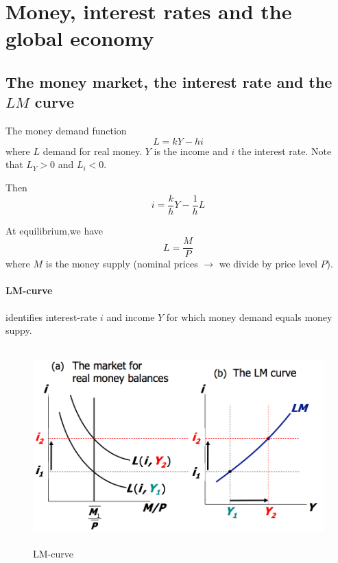 \documentclass[a4paper] {scrartcl}
\begin{document}

\section{Money, interest rates and the global economy} %
\label{sec:money_interest_rates_and_the_global_economy}

\subsection{The money market, the interest rate and the $LM$ curve} %
\label{sub:the_money_market_the_interest_rate_and_the_lm_curve}


The money demand function
\begin{equation}
	L = kY- hi
\end{equation}
where 
$L$ demand for real money.
$Y$ is the income and
$i$ the interest rate.
Note that $L_Y>0$ and $L_i<0$.

Then 
\begin{equation}
	i = \frac{k}{h}Y-\frac{1}{h}L
\end{equation}

At equilibrium,we have
\begin{equation}
	L = \frac{M}{P}
\end{equation}
where $M$ is the money supply (nominal prices $\rightarrow$ we divide by price level $P$).

\paragraph{LM-curve} %
\label{par:lm_curve}
identifies interest-rate $i$ and income $Y$ for which money demand equals money suppy.

\begin{figure}[htbp]
	\centering
		\includegraphics[height=3in]{images/LM-curve.png}
	\caption{LM-curve}
	\label{fig:images_LM-curve}
\end{figure}
\end{document}
